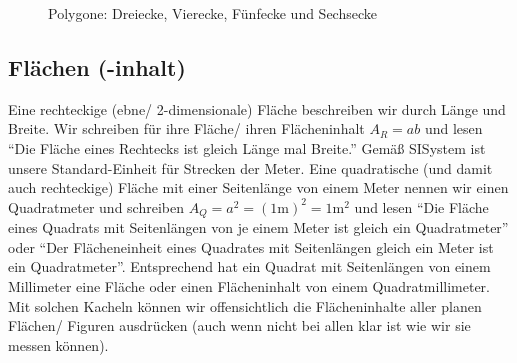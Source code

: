 \documentclass[a4paper]{book}%
\theoremstyle{definition}
\begin{document}
\begin{figure}
  \centering
  \caption{Polygone: Dreiecke, Vierecke, Fünfecke und Sechsecke}\label{fig:Polygone}
\end{figure}



\subsection{Flächen (-inhalt)}

Eine rechteckige (ebne/ 2-dimensionale) Fläche beschreiben wir durch Länge und Breite. Wir schreiben für ihre Fläche/ ihren Flächeninhalt $A_R = a b$ und lesen \enquote{Die Fläche eines Rechtecks ist gleich Länge mal Breite.} Gemäß \gls{SISystem} ist unsere Standard-Einheit für Strecken der Meter. Eine quadratische (und damit auch rechteckige) Fläche mit einer Seitenlänge von einem Meter nennen wir einen Quadratmeter und schreiben $A_Q = a^2 = (1\text{m})^2 = 1\text{m}^2$ und lesen \enquote{Die Fläche eines Quadrats mit Seitenlängen von je einem Meter ist gleich ein Quadratmeter} oder \enquote{Der Flächeneinheit eines Quadrates mit Seitenlängen gleich ein Meter ist ein Quadratmeter}. Entsprechend hat ein Quadrat mit Seitenlängen von einem Millimeter eine Fläche oder einen Flächeninhalt von einem Quadratmillimeter. Mit solchen Kacheln können wir offensichtlich die Flächeninhalte aller planen Flächen/ Figuren ausdrücken (auch wenn nicht bei allen klar ist wie wir sie messen können).
\end{document}
